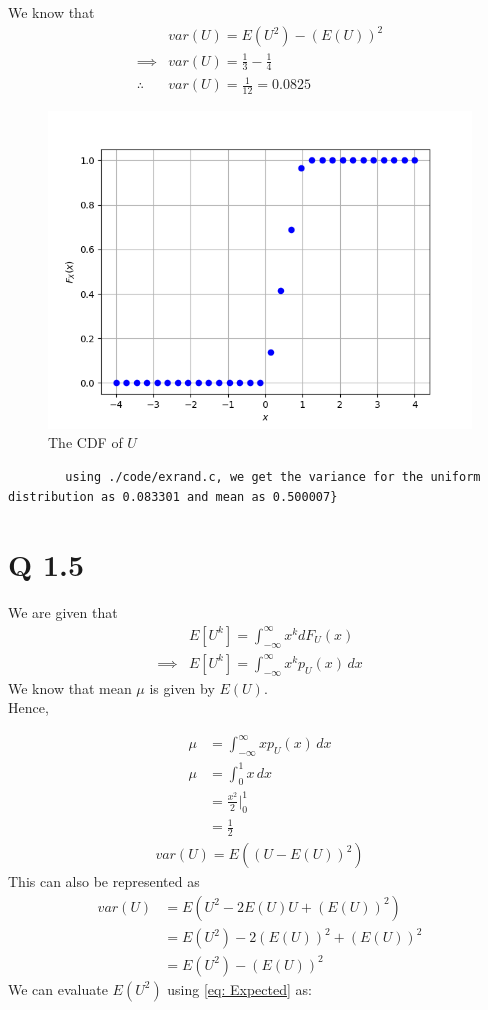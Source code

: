 \documentclass[journal,12pt,twocolumn]{IEEEtran}
\begin{document}
We know that
\begin{align}
    &var(U) = E(U^2) - (E(U))^2 \\
    \implies&var(U) = \frac{1}{3} - \frac{1}{4} \\
    \therefore &var(U) = \frac{1}{12} = 0.0825
\end{align}
\begin{figure}[!ht]
\centering
\includegraphics[width=\columnwidth]{./figs/Figure_Q1.png}
\caption{The CDF of $U$}
\label{fig: uniform distribution}
\end{figure}


    \begin{lstlisting}
        using ./code/exrand.c, we get the variance for the uniform distribution as 0.083301 and mean as 0.500007}
    \end{lstlisting}
\section {Q 1.5}
We are given that
\begin{align}
            &E[U^k] = \int^{\infty}_{-\infty} x^k dF_U(x)\\
    \implies&E[U^k] = \int^{\infty}_{-\infty} x^k p_U(x) \,dx		\label{eq: Expected}
\end{align}
We know that mean $\mu$ is given by $E(U)$.\\ Hence,

\begin{align}
    \mu &= \int_{-\infty}^{\infty} x p_U(x) \,dx\label{eq:Relation_1}\\
		\mu &= \int_{0}^{1} x \,dx \\
		&= \frac{x^2}{2} \big|^{1}_{0} \\
		&= \frac{1}{2} 	\label{eq: Mean}
\end{align}
\begin{align}
    var(U) = E((U - E(U))^2)
\end{align}
This can also be represented as
\begin{align}
		var(U) &= E(U^2 - 2E(U)U + (E(U))^2) \\
		&= E(U^2) - 2(E(U))^2 + (E(U))^2 \\
		&= E(U^2) - (E(U))^2
		\label{eq: Relation_2}
\end{align}
We can evaluate $E(U^2)$ using \eqref{eq: Expected} as:
	
\end{document}

